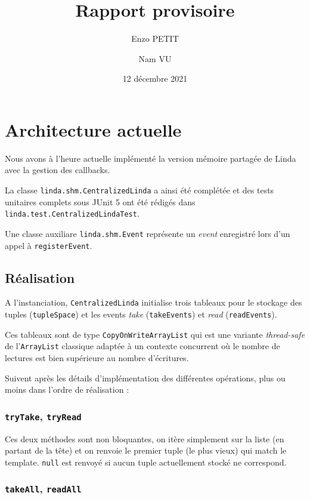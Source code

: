 \documentclass[headings=standardclasses,parskip=half]{scrartcl}
\title{Rapport provisoire}
\subtitle{}
\author{Enzo PETIT \and Nam VU}
\date{12 décembre 2021}
\begin{document}
\maketitle

\section*{Architecture actuelle}

Nous avons à l'heure actuelle implémenté la version mémoire partagée
de Linda avec la gestion des callbacks.

La classe \texttt{linda.shm.CentralizedLinda} a ainsi été complétée et
des tests unitaires complets sous JUnit 5 ont été rédigés dans
\texttt{linda.test.CentralizedLindaTest}.

Une classe auxiliare \texttt{linda.shm.Event} représente un
\emph{event} enregistré lors d'un appel à \texttt{registerEvent}.

\subsection*{Réalisation}

A l'instanciation, \texttt{CentralizedLinda} initialise trois tableaux
pour le stockage des tuples (\texttt{tupleSpace}) et les events
\emph{take} (\texttt{takeEvents}) et \emph{read} (\texttt{readEvents}).

Ces tableaux sont de type \texttt{CopyOnWriteArrayList} qui est une
variante \emph{thread-safe} de l'\texttt{ArrayList} classique adaptée
à un contexte concurrent où le nombre de lectures est bien supérieure
au nombre d'écritures.

Suivent après les détails d'implémentation des différentes opérations,
plus ou moins dans l'ordre de réalisation :

\subsubsection*{\texttt{tryTake}, \texttt{tryRead}}

Ces deux méthodes sont non bloquantes, on itère simplement sur la liste
(en partant de la tête) et on renvoie le premier tuple (le plus vieux)
qui match le template. \texttt{null} est renvoyé si aucun tuple
actuellement stocké ne correspond.

\subsubsection*{\texttt{takeAll}, \texttt{readAll}}
\end{document}
